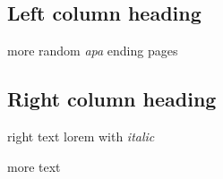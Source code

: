 \begin{pages}
\begin{Leftside}
\beginnumbering
\pstart
\section{Left column heading}\hypertarget{left-column-heading}{}\label{left-column-heading}

\pend
\pstart
more random \emph{apa}
ending pages

\pend
\endnumbering
\end{Leftside}
\begin{Rightside}
\beginnumbering
\pstart
\section{Right column heading}\hypertarget{right-column-heading}{}\label{right-column-heading}

\pend
\pstart
right text lorem with \emph{italic}

\pend
\endnumbering
\end{Rightside}
\end{pages}
\Pages
more text


